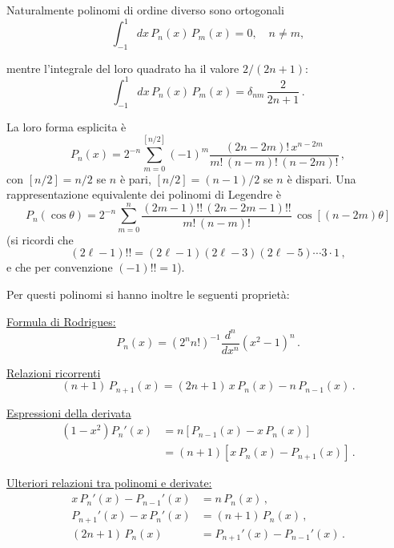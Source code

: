 \documentclass[11pt, a4paper]{book}
\numberwithin{equation}{section}
\begin{document}
Naturalmente polinomi di ordine diverso sono ortogonali
\begin{equation}
\int_{-1}^{1} dx\, P_n(x)\, P_m(x) = 0, \quad n \neq m, \tag{21}
\end{equation}


mentre l'integrale del loro quadrato ha il valore $2/(2n+1)$:
\begin{equation}
\int_{-1}^{1} dx\, P_n(x)\, P_m(x) = \delta_{nm}\, \frac{2}{2n+1} \,. \tag{22}
\end{equation}

La loro forma esplicita è
\begin{equation}
P_n(x) = 2^{-n} \sum_{m=0}^{[n/2]} (-1)^m \frac{(2n-2m)!\, x^{n-2m}}{m!\,(n-m)!\,(n-2m)!} \,, \tag{23}
\end{equation}
con $[n/2] = n/2$ se $n$ è pari, $[n/2] = (n-1)/2$
se $n$ è dispari. Una rappresentazione equivalente dei polinomi di Legendre è
\begin{equation}
P_n(\cos\theta) = 2^{-n} \sum_{m=0}^{n} \frac{(2m-1)!!\,(2n-2m-1)!!}{m!\,(n-m)!}\, \cos[(n-2m)\theta] \tag{24}
\end{equation}
(si ricordi che
\[
(2\ell-1)!! = (2\ell-1)(2\ell-3)(2\ell-5)\cdots 3 \cdot 1 \,,
\]
e che per convenzione $(-1)!! = 1$).

Per questi polinomi si hanno inoltre le seguenti proprietà:

\medskip
\noindent\uline{Formula di Rodrigues:}
\begin{equation}
P_n(x) = \left(2^n n!\right)^{-1} \frac{d^n}{dx^n} \left(x^2 - 1\right)^n \,. \tag{25}
\end{equation}

\medskip
\noindent\uline{Relazioni ricorrenti}
\begin{equation}
(n+1)\, P_{n+1}(x) = (2n+1)\, x\, P_n(x) - n\, P_{n-1}(x) \,. \tag{26}
\end{equation}

\medskip
\noindent\uline{Espressioni della derivata}
\begin{align}
(1-x^2) P_n'(x) &= n\left[P_{n-1}(x) - x\, P_n(x)\right] \tag{27a} \\
&= (n+1)\left[x\, P_n(x) - P_{n+1}(x)\right] \,. \tag{27b}
\end{align}


\medskip
\noindent\uline{Ulteriori relazioni tra polinomi e derivate:}
\begin{align}
x\, P_n'(x) - P_{n-1}'(x) &= n\, P_n(x) \,, \tag{28a} \\
P_{n+1}'(x) - x\, P_n'(x) &= (n+1)\, P_n(x) \,, \tag{28b} \\
(2n+1)\, P_n(x) &= P_{n+1}'(x) - P_{n-1}'(x) \,. \tag{28c}
\end{align}
\end{document}

